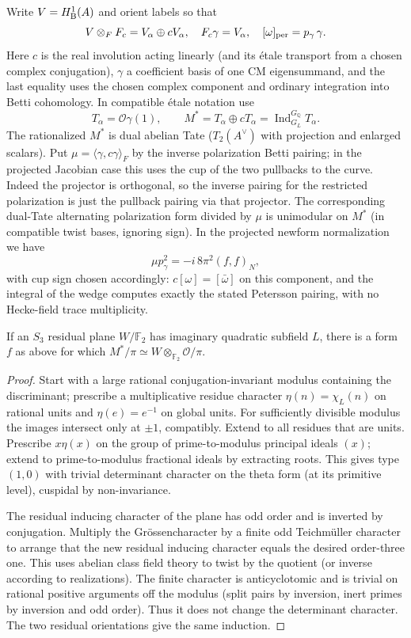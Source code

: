 Write \(V=H^1_{\rm B}(A)\) and orient labels so that
\[
    V\otimes_F F_c=V_\alpha\oplus c V_\alpha,\quad
    F_c\gamma=V_\alpha,\quad [\omega]_{\rm per}=p_\gamma\,\gamma .
\]
Here \(c\) is the real involution acting linearly (and its étale transport from a chosen
complex conjugation), \(\gamma\) a coefficient basis of one CM eigensummand, and the last
equality uses the chosen complex component and ordinary integration into Betti cohomology. In
compatible étale notation use
\[
       T_\alpha=\mathcal O\gamma(1),\qquad
       M^*=T_\alpha\oplus cT_\alpha
              =\operatorname{Ind}_{G_L}^{G_{\mathbb Q}}T_\alpha .
\]
The rationalized \(M^*\) is dual abelian Tate (\(T_2(A^\vee)\) with projection and enlarged
scalars). Put \(\mu=\langle\gamma,c\gamma\rangle_F\) by the inverse polarization Betti
pairing; in the projected Jacobian case this uses the cup of the two pullbacks to the curve.
Indeed the projector is orthogonal, so the inverse pairing for the restricted polarization is
just the pullback pairing via that projector. The corresponding dual-Tate alternating
polarization form divided by \(\mu\) is unimodular on \(M^*\) (in compatible twist bases,
ignoring sign). In the projected newform normalization we have
\[
                   \mu p_\gamma^2=-i\,8\pi^2(f,f)_N,                 \tag{C1}\label{eq:C1}
\]
with cup sign chosen accordingly: \(c[\omega]=[\bar\omega]\) on this component, and the
integral of the wedge computes exactly the stated Petersson pairing, with no Hecke-field trace
multiplicity.

\begin{lemma}\label{cm:residual-lift}
If an \(S_3\) residual plane \(W/\mathbb F_2\) has imaginary quadratic
subfield \(L\), there is a form \(f\) as above for which
\(M^*/\pi\simeq W\otimes_{\mathbb F_2}\mathcal O/\pi\).
\end{lemma}

\begin{proof}
Start with a large rational conjugation-invariant modulus containing the discriminant;
prescribe a multiplicative residue character \(\eta(n)=\chi_L(n)\) on rational units and
\(\eta(e)=e^{-1}\) on global units. For sufficiently divisible modulus the images intersect
only at \(\pm1\), compatibly. Extend to all residues that are units. Prescribe \(x\eta(x)\) on
the group of prime-to-modulus principal ideals \((x)\); extend to prime-to-modulus fractional
ideals by extracting roots. This gives type \((1,0)\) with trivial determinant character on
the theta form (at its primitive level), cuspidal by non-invariance.

The residual inducing character of the plane has odd order and is inverted by conjugation.
Multiply the Grössencharacter by a finite odd Teichmüller character to arrange that the new
residual inducing character equals the desired order-three one. This uses abelian class field
theory to twist by the quotient (or inverse according to realizations). The finite character
is anticyclotomic and is trivial on rational positive arguments off the modulus (split pairs
by inversion, inert primes by inversion and odd order). Thus it does not change the
determinant character. The two residual orientations give the same induction.
\end{proof}

